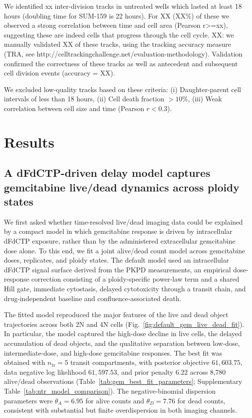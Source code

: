 \documentclass[11pt,notitlepage]{article}
\begin{document}
We identified xx inter-division tracks in untreated wells which lasted at least 18 hours (doubling time for SUM-159 is 22 hours). For XX (XX\%) of these we observed a strong correlation between time and cell area (Pearson r>=xx), suggesting these are indeed cells that progress through the cell cycle.
XX: we manually validated XX of these tracks, using the tracking accuracy measure (TRA, see http://celltrackingchallenge.net/evaluation-methodology). Validation confirmed the correctness of these tracks as well as antecedent and subsequent cell division events (accuracy = XX).\newline

We excluded low-quality tracks based on these criteria: (i) Daughter-parent cell intervals of less than 18 hours, (ii) Cell death fraction \( > 10\% \), (iii) Weak correlation between cell size and time (Pearson \( r < 0.3 \)).


\section*{Results}


\subsection*{A dFdCTP-driven delay model captures gemcitabine live/dead dynamics across ploidy states}

We first asked whether time-resolved live/dead imaging data could be explained by a compact model in which gemcitabine response is driven by intracellular dFdCTP exposure, rather than by the administered extracellular gemcitabine dose alone. To this end, we fit a joint alive/dead count model across gemcitabine doses, replicates, and ploidy states. The default model used an intracellular dFdCTP signal surface derived from the PKPD measurements, an empirical dose-response correction consisting of a ploidy-specific power-law term and a shared Hill gate, immediate cytostasis, delayed cytotoxicity through a transit chain, and drug-independent baseline and confluence-associated death.

The fitted model reproduced the major features of the live and dead object trajectories across both 2N and 4N cells (Fig.~\ref{fig:default_gem_live_dead_fit}). In particular, the model captured the high-dose decline in live cells, the delayed accumulation of dead objects, and the qualitative separation between low-dose, intermediate-dose, and high-dose gemcitabine responses. The best fit was obtained with \(n_{\mathrm{tr}}=5\) transit compartments, with posterior objective \(61{,}603.75\), data negative log likelihood \(61{,}597.53\), and prior penalty \(6.22\) across 8,780 alive/dead observations (Table~\ref{tab:gem_best_fit_parameters}; Supplementary Table~\ref{tab:ntr_model_comparison}). The negative-binomial dispersion parameters were \(\theta_A=6.95\) for alive counts and \(\theta_D=7.76\) for dead counts, consistent with substantial but finite overdispersion in both imaging channels.
\end{document}
